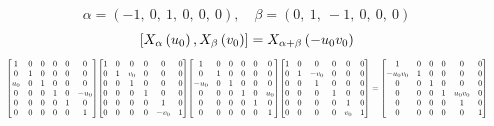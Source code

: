 \documentclass[11pt]{article}
\theoremstyle{definition}
\begin{document}
\[
\alpha = \left( -1, \  0, \  1, \  0, \  0, \  0\right), \quad \beta = \left( 0, \  1, \  -1, \  0, \  0, \  0\right)
\]
\[
\scaletoalign{\textwidth}{\left[ X_{\alpha}\left(u_{0}\right), X_{\beta}\left(v_{0}\right) \right] = X_{\alpha + \beta}\left(- u_{0} v_{0}\right)}
\]
\[
\scaletoalign{\textwidth}{{\left[\begin{matrix}1 & 0 & 0 & 0 & 0 & 0\\0 & 1 & 0 & 0 & 0 & 0\\u_{0} & 0 & 1 & 0 & 0 & 0\\0 & 0 & 0 & 1 & 0 & - u_{0}\\0 & 0 & 0 & 0 & 1 & 0\\0 & 0 & 0 & 0 & 0 & 1\end{matrix}\right]} {\left[\begin{matrix}1 & 0 & 0 & 0 & 0 & 0\\0 & 1 & v_{0} & 0 & 0 & 0\\0 & 0 & 1 & 0 & 0 & 0\\0 & 0 & 0 & 1 & 0 & 0\\0 & 0 & 0 & 0 & 1 & 0\\0 & 0 & 0 & 0 & - v_{0} & 1\end{matrix}\right]} {\left[\begin{matrix}1 & 0 & 0 & 0 & 0 & 0\\0 & 1 & 0 & 0 & 0 & 0\\- u_{0} & 0 & 1 & 0 & 0 & 0\\0 & 0 & 0 & 1 & 0 & u_{0}\\0 & 0 & 0 & 0 & 1 & 0\\0 & 0 & 0 & 0 & 0 & 1\end{matrix}\right]} {\left[\begin{matrix}1 & 0 & 0 & 0 & 0 & 0\\0 & 1 & - v_{0} & 0 & 0 & 0\\0 & 0 & 1 & 0 & 0 & 0\\0 & 0 & 0 & 1 & 0 & 0\\0 & 0 & 0 & 0 & 1 & 0\\0 & 0 & 0 & 0 & v_{0} & 1\end{matrix}\right]} = {\left[\begin{matrix}1 & 0 & 0 & 0 & 0 & 0\\- u_{0} v_{0} & 1 & 0 & 0 & 0 & 0\\0 & 0 & 1 & 0 & 0 & 0\\0 & 0 & 0 & 1 & u_{0} v_{0} & 0\\0 & 0 & 0 & 0 & 1 & 0\\0 & 0 & 0 & 0 & 0 & 1\end{matrix}\right]}}
\]
\end{document}
